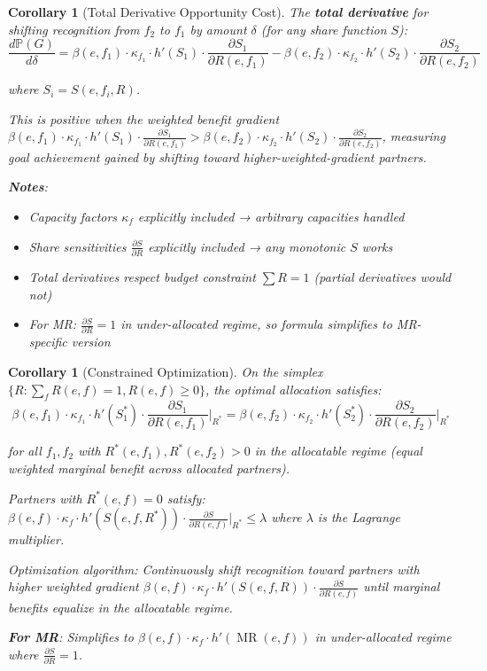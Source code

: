 \documentclass[11pt,a4paper]{article}
\newtheorem{corollary}[theorem]{Corollary}
\theoremstyle{definition}
\theoremstyle{remark}
\DeclareMathOperator{\MR}{MR}
\begin{document}
\begin{corollary}[Total Derivative Opportunity Cost]
The \textbf{total derivative} for shifting recognition from $f_2$ to $f_1$ by amount $\delta$ (for any share function $S$):
\[ \frac{d\mathbb{P}(G)}{d\delta} = \beta(e,f_1) \cdot \kappa_{f_1} \cdot h'(S_1) \cdot \frac{\partial S_1}{\partial R(e,f_1)} - \beta(e,f_2) \cdot \kappa_{f_2} \cdot h'(S_2) \cdot \frac{\partial S_2}{\partial R(e,f_2)} \]

where $S_i = S(e,f_i,R)$.

This is positive when the weighted benefit gradient $\beta(e,f_1) \cdot \kappa_{f_1} \cdot h'(S_1) \cdot \frac{\partial S_1}{\partial R(e,f_1)} > \beta(e,f_2) \cdot \kappa_{f_2} \cdot h'(S_2) \cdot \frac{\partial S_2}{\partial R(e,f_2)}$, measuring goal achievement gained by shifting toward higher-weighted-gradient partners.

\textbf{Notes}:
\begin{itemize}
\item Capacity factors $\kappa_f$ explicitly included → arbitrary capacities handled
\item Share sensitivities $\frac{\partial S}{\partial R}$ explicitly included → any monotonic $S$ works
\item Total derivatives respect budget constraint $\sum R = 1$ (partial derivatives would not)
\item For MR: $\frac{\partial S}{\partial R} = 1$ in under-allocated regime, so formula simplifies to MR-specific version
\end{itemize}
\end{corollary}

\begin{corollary}[Constrained Optimization]
On the simplex $\{R : \sum_f R(e,f) = 1, R(e,f) \ge 0\}$, the optimal allocation satisfies:
\[ \beta(e,f_1) \cdot \kappa_{f_1} \cdot h'(S^*_1) \cdot \frac{\partial S_1}{\partial R(e,f_1)}\bigg|_{R^*} = \beta(e,f_2) \cdot \kappa_{f_2} \cdot h'(S^*_2) \cdot \frac{\partial S_2}{\partial R(e,f_2)}\bigg|_{R^*} \]

for all $f_1, f_2$ with $R^*(e,f_1), R^*(e,f_2) > 0$ in the allocatable regime (equal weighted marginal benefit across allocated partners).

Partners with $R^*(e,f) = 0$ satisfy: $\beta(e,f) \cdot \kappa_f \cdot h'(S(e,f,R^*)) \cdot \frac{\partial S}{\partial R(e,f)}\bigg|_{R^*} \le \lambda$ where $\lambda$ is the Lagrange multiplier.

Optimization algorithm: Continuously shift recognition toward partners with higher weighted gradient $\beta(e,f) \cdot \kappa_f \cdot h'(S(e,f,R)) \cdot \frac{\partial S}{\partial R(e,f)}$ until marginal benefits equalize in the allocatable regime.

\textbf{For MR}: Simplifies to $\beta(e,f) \cdot \kappa_f \cdot h'(\MR(e,f))$ in under-allocated regime where $\frac{\partial S}{\partial R} = 1$.
\end{corollary}
\end{document}
